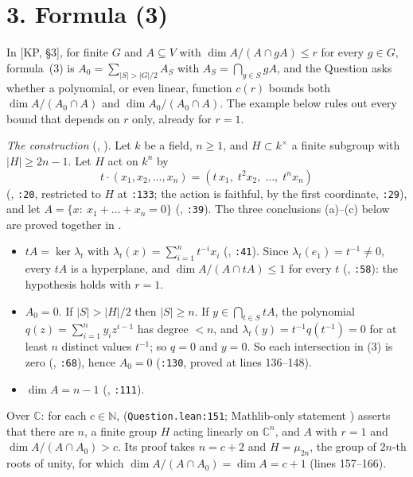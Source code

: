 \documentclass[11pt]{amsart}
\begin{document}
\section*{3. Formula (3)}

In [KP, \S3], for finite $G$ and $A\subseteq V$ with $\dim A/(A\cap gA)\le r$ for every $g\in G$, formula~(3) is
$A_0=\sum_{|S|>|G|/2}A_S$ with $A_S=\bigcap_{g\in S}gA$, and the Question asks whether a polynomial, or even linear,
function $c(r)$ bounds both $\dim A/(A_0\cap A)$ and $\dim A_0/(A_0\cap A)$. The example below rules out every bound that
depends on $r$ only, already for $r=1$.

\emph{The construction} (, ).
Let $k$ be a field, $n\ge1$, and $H\subset k^\times$ a finite subgroup with $|H|\ge 2n-1$. Let $H$ act on $k^n$ by
\[t\cdot(x_1,x_2,\dots,x_n)=(t\,x_1,\;t^2x_2,\;\dots,\;t^nx_n)\]
(, \texttt{:20}, restricted to $H$ at \texttt{:133}; the action is faithful, by the first coordinate,
\texttt{:29}), and let $A=\{x:\ x_1+\dots+x_n=0\}$ (, \texttt{:39}). The three conclusions (a)--(c) below are
proved together in .
\begin{itemize}
\item[(a)] $tA=\ker\lambda_t$ with $\lambda_t(x)=\sum_{i=1}^n t^{-i}x_i$ (, \texttt{:41}). Since
$\lambda_t(e_1)=t^{-1}\ne0$, every $tA$ is a hyperplane, and $\dim A/(A\cap tA)\le1$ for every $t$
(, \texttt{:58}): the hypothesis holds with $r=1$.
\item[(b)] $A_0=0$. If $|S|>|H|/2$ then $|S|\ge n$. If $y\in\bigcap_{t\in S}tA$, the polynomial
$q(z)=\sum_{i=1}^n y_iz^{i-1}$ has degree $<n$, and $\lambda_t(y)=t^{-1}q(t^{-1})=0$ for at least $n$ distinct values
$t^{-1}$; so $q=0$ and $y=0$. So each intersection in (3) is zero (, \texttt{:68}), hence $A_0=0$
(\texttt{:130}, proved at lines 136--148).
\item[(c)] $\dim A=n-1$ (, \texttt{:111}).
\end{itemize}
Over $\mathbb C$: for each $c\in\mathbb N$,  (\texttt{Question.lean:151};
Mathlib-only statement ) asserts that there are $n$, a finite group $H$ acting linearly
on $\mathbb C^n$, and $A$ with $r=1$ and $\dim A/(A\cap A_0)>c$. Its proof takes $n=c+2$ and $H=\mu_{2n}$, the group of
$2n$-th roots of unity, for which $\dim A/(A\cap A_0)=\dim A=c+1$ (lines 157--166).
\end{document}

